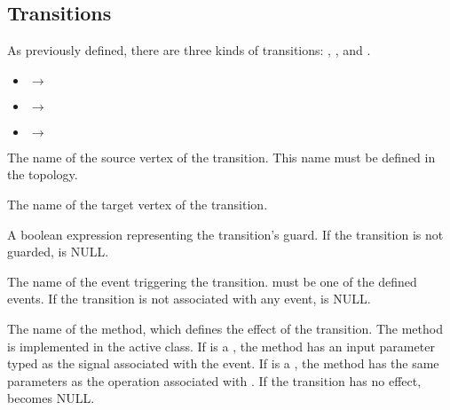 \subsection{Transitions}
As previously defined, there are three kinds of transitions: , , and .

\noindent
{}
\begin{itemize}[\footnotesize]
\item {} $\rightarrow$  

\item {}$\rightarrow$

\item {} $\rightarrow$ 
\end{itemize}

\noindent
{}
\begin{description}[\footnotesize]
	\item[\ttt{src}] The name of the source vertex of the transition. 
	This name must be defined in the topology.
	
	\item[\ttt{tgt}] The name of the target vertex of the transition. 
	
	\item[\ttt{guard}] A boolean expression representing the transition's guard. If the transition is not guarded,  is NULL.
	
	\item[\ttt{evt}] The name of the event triggering the transition. 
	 must be one of the defined events. 
	If the transition is not associated with any event,  is NULL.
	
	\item[\ttt{eff}] The name of the method, which defines the effect of the transition.
	The method is implemented in the active class.
	If  is a , the method has an input parameter typed as the signal associated with the event.
	If  is a , the method has the same parameters as the operation associated with .
	If the transition has no effect,  becomes NULL.
\end{description}

